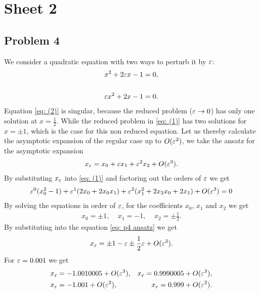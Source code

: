 


\maketitle
\tableofcontents

\section{Sheet 2}
\subsection{Problem 4}
We consider a quadratic equation with two ways to perturb it by $\varepsilon$:
\begin{align}
    x^2 + 2\varepsilon x -1 = 0, \label{eq: (1)}\\
    \nonumber \\
    \varepsilon x^2 + 2x - 1 = 0.\label{eq: (2)}
\end{align}
Equation \ref{eq: (2)} is singular, because the reduced problem ($\varepsilon
\rightarrow 0$) has only one solution at $x = \frac{1}{2}$. While the reduced
problem in \ref{eq: (1)} has two solutions for $x = \pm 1$, which is the case
for this non reduced equation. Let us thereby calculate the asymptotic
expansion of the regular case up to $O(\varepsilon^2)$, we take the ansatz for the
asymptotic expansion
\begin{align}\label{eq: p4 ansatz}
    x_\varepsilon = x_0 + \varepsilon x_1 + \varepsilon^2 x_2 + O(\varepsilon^3).
\end{align}
By substituting $x_\varepsilon$ into \ref{eq: (1)} and factoring out the orders of
$\varepsilon$ we get
\begin{align}
    \varepsilon^0 (x_0^2 - 1) + \varepsilon^1(2x_0 + 2x_0x_1) + \varepsilon^2(x_1^2+2x_2x_0
    +2x_1) + O(\varepsilon^3) = 0
\end{align}
By solving the equations in order of $\varepsilon$, for the coefficients
$x_0$, $x_1$ and $x_2$ we get
\begin{align}
    x_0 = \pm 1, \;\;\;\; x_1 = -1, \;\;\;\; x_2 = \pm \frac{1}{2}.
\end{align}
By substituting into the equation \ref{eq: p4 ansatz} we get
\begin{align}
    x_\varepsilon = \pm 1 - \varepsilon \pm \frac{1}{2} \varepsilon + O(\varepsilon^3).
\end{align}
For $\varepsilon = 0.001$ we get
\begin{align}
    &x_\varepsilon = -1.0010005 + O(\varepsilon^3),  &x_\varepsilon = 0.9990005 + O(\varepsilon^3),\\
    &x_\varepsilon = -1.001 + O(\varepsilon^2),      &x_\varepsilon = 0.999 + O(\varepsilon^2).
\end{align}
